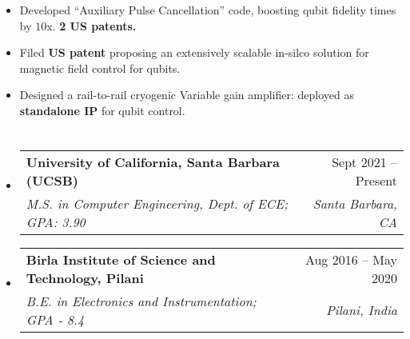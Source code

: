 \documentclass[letterpaper,11pt]{article}
\makeatletter
\newcommand{\resumeItem}[1]{
  \item\small{
    {#1 \vspace{-2pt}}
  }
}
\newcommand{\resumeSubheading}[4]{
  \vspace{-1pt}\item
    \begin{tabular*}{0.97\textwidth}{l@{\extracolsep{\fill}}r}
      \textbf{#1} & #2 \\
      \textit{\small#3} & \textit{\small #4} \\
    \end{tabular*}\vspace{-5pt}
}
\newcommand{\resumeSubHeadingListStart}{\begin{itemize}[leftmargin=0.01in, label={}]}
\newcommand{\resumeSubHeadingListEnd}{\end{itemize}}
\newcommand{\resumeItemListStart}{\begin{itemize}}
\makeatother
\begin{document}
      \resumeItemListStart
       \resumeItem{\normalsize{ Developed ``Auxiliary Pulse Cancellation” code, boosting qubit fidelity times by $10$x. \textbf{2 US patents.} }}
      \resumeItem{\normalsize{Filed \textbf{US patent} proposing an extensively scalable in-silco solution for magnetic field control for qubits. }}
        \resumeItem{\normalsize{Designed a rail-to-rail cryogenic Variable gain amplifier: deployed as \textbf{standalone IP} for qubit control.}}
 
   
        
       
  \resumeSubHeadingListEnd
\vspace{-12pt}


\section{\normalsize{\color{cvblue}{EDUCATION}}}
  \resumeSubHeadingListStart
    \resumeSubheading
      {University of California, Santa Barbara (UCSB)}{Sept 2021 -- Present}
      { M.S. in Computer Engineering, Dept. of ECE; GPA: 3.90}{Santa Barbara, CA}
  \resumeSubHeadingListEnd
  \vspace{-8pt}
  \resumeSubHeadingListStart
     \resumeSubheading
      {Birla Institute of Science and Technology, Pilani}{Aug 2016 --  May 2020}
      {B.E. in Electronics and Instrumentation; GPA - 8.4}{Pilani, India}
  \resumeSubHeadingListEnd

 \vspace{-10pt}


\section{\normalsize{\color{cvblue}{RELEVANT COURSEWORK}}}
\end{document}
